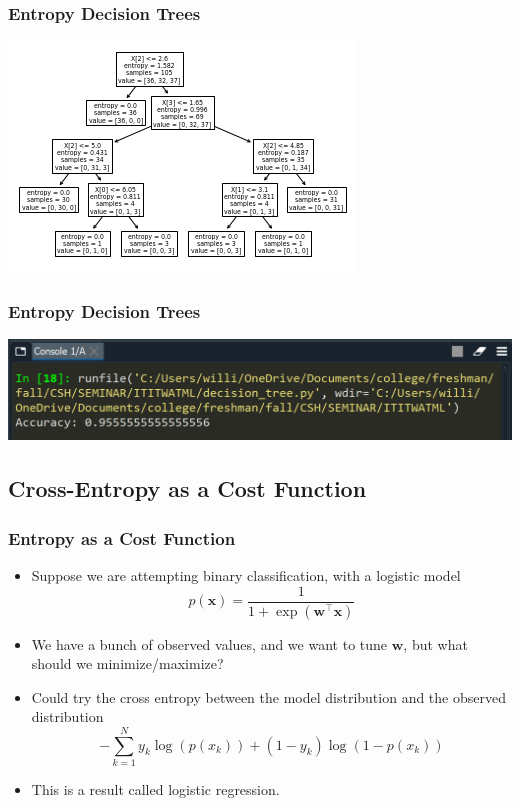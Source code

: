 \documentclass[xcolor=dvipsnames]{beamer}
\begin{document}
    \begin{frame}
    \frametitle{Entropy Decision Trees}
        \begin{center}
            \includegraphics[width=\textwidth]{depth4.png}
        \end{center}
    \end{frame}
    
    \begin{frame}
    \frametitle{Entropy Decision Trees}
        \begin{center}
            \includegraphics[width=\textwidth]{Ipyth.PNG}
        \end{center}
    \end{frame}
    	
	\subsection{Cross-Entropy as a Cost Function}
	\begin{frame}
	\frametitle{Entropy as a Cost Function}
    	\begin{itemize}
    	    \item Suppose we are attempting binary classification, with a logistic model $$ p(\mathbf{x}) = \frac{1}{1 + \exp \left( \mathbf{w}^\top \mathbf{x}\right)} $$
    	    \pause
    	    \item We have a bunch of observed values, and we want to tune $\mathbf{w}$, but what should we minimize/maximize?
    	    \pause
    	    \item Could try the cross entropy between the model distribution and the observed distribution
    	    \pause  $$ -\sum_{k=1}^N y_k \log(p(x_k)) + (1-y_k)\log(1-p(x_k))$$
    	    \item This is a result called logistic regression. 
    	\end{itemize}
	\end{frame}
	
\end{document}
